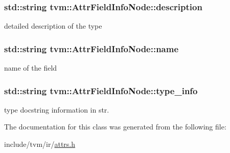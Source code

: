 \subsubsection[{\texorpdfstring{description}{description}}]{\setlength{\rightskip}{0pt plus 5cm}std\+::string tvm\+::\+Attr\+Field\+Info\+Node\+::description}\hypertarget{classtvm_1_1AttrFieldInfoNode_a1a281d5417d10840872e3c2c67c7290b}{}\label{classtvm_1_1AttrFieldInfoNode_a1a281d5417d10840872e3c2c67c7290b}


detailed description of the type 

\subsubsection[{\texorpdfstring{name}{name}}]{\setlength{\rightskip}{0pt plus 5cm}std\+::string tvm\+::\+Attr\+Field\+Info\+Node\+::name}\hypertarget{classtvm_1_1AttrFieldInfoNode_a94f3593b41c2dd3be2aea793794d4dca}{}\label{classtvm_1_1AttrFieldInfoNode_a94f3593b41c2dd3be2aea793794d4dca}


name of the field 

\subsubsection[{\texorpdfstring{type\+\_\+info}{type_info}}]{\setlength{\rightskip}{0pt plus 5cm}std\+::string tvm\+::\+Attr\+Field\+Info\+Node\+::type\+\_\+info}\hypertarget{classtvm_1_1AttrFieldInfoNode_a625467e8153ee8657ae080693baa374c}{}\label{classtvm_1_1AttrFieldInfoNode_a625467e8153ee8657ae080693baa374c}


type docstring information in str. 



The documentation for this class was generated from the following file\+:\begin{DoxyCompactItemize}
\item 
include/tvm/ir/\hyperlink{ir_2attrs_8h}{attrs.\+h}\end{DoxyCompactItemize}
